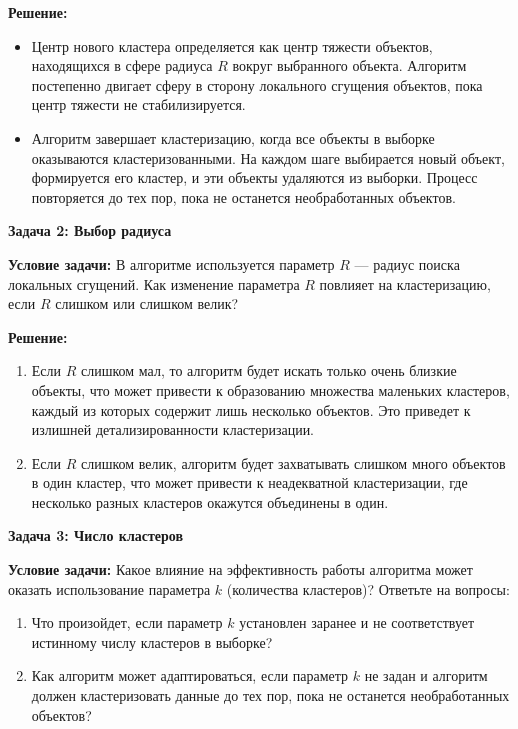 \textbf{Решение:}
\begin{itemize}
    \item Центр нового кластера определяется как центр тяжести объектов, находящихся в сфере радиуса \( R \) вокруг выбранного объекта. Алгоритм постепенно двигает сферу в сторону локального сгущения объектов, пока центр тяжести не стабилизируется.
    \item Алгоритм завершает кластеризацию, когда все объекты в выборке оказываются кластеризованными. На каждом шаге выбирается новый объект, формируется его кластер, и эти объекты удаляются из выборки. Процесс повторяется до тех пор, пока не останется необработанных объектов.
\end{itemize}

\vspace{1em}

\textbf{Задача 2: Выбор радиуса}

\textbf{Условие задачи:}
В алгоритме используется параметр \( R \) — радиус поиска локальных сгущений. Как изменение параметра \( R \) повлияет на кластеризацию, если \( R \) слишком или слишком велик?

\textbf{Решение:}
\begin{enumerate}
    \item Если \( R \) слишком мал, то алгоритм будет искать только очень близкие объекты, что может привести к образованию множества маленьких кластеров, каждый из которых содержит лишь несколько объектов. Это приведет к излишней детализированности кластеризации.
    \item Если \( R \) слишком велик, алгоритм будет захватывать слишком много объектов в один кластер, что может привести к неадекватной кластеризации, где несколько разных кластеров окажутся объединены в один.
\end{enumerate}

\vspace{1em}

\textbf{Задача 3: Число кластеров}

\textbf{Условие задачи:}
Какое влияние на эффективность работы алгоритма может оказать использование параметра \( k \) (количества кластеров)? Ответьте на вопросы:
\begin{enumerate}
    \item Что произойдет, если параметр \( k \) установлен заранее и не соответствует истинному числу кластеров в выборке?
    \item Как алгоритм может адаптироваться, если параметр \( k \) не задан и алгоритм должен кластеризовать данные до тех пор, пока не останется необработанных объектов?
\end{enumerate}

